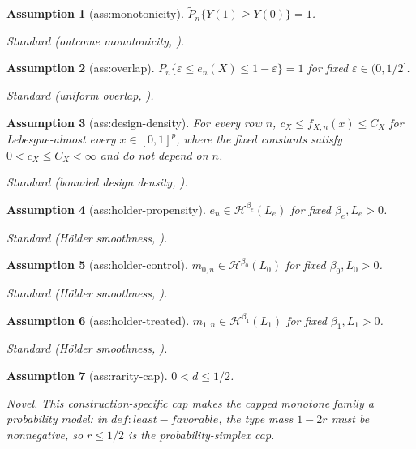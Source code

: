 \documentclass{article}
\newtheorem{assumption}{Assumption}
\begin{document}
\begin{assumption}[ass:monotonicity]\label{ass:monotonicity}
\(\widetilde P_n\{Y(1)\ge Y(0)\}=1\).
\par\smallskip\noindent\emph{Standard} (outcome monotonicity, \cite{TianPearl2000}).
\end{assumption}

\begin{assumption}[ass:overlap]\label{ass:overlap}
\(P_n\{\varepsilon\le e_n(X)\le1-\varepsilon\}=1\) for fixed \(\varepsilon\in(0,1/2]\).
\par\smallskip\noindent\emph{Standard} (uniform overlap, \cite{ChernozhukovEtAl2018DML}).
\end{assumption}

\begin{assumption}[ass:design-density]\label{ass:design-density}
For every row \(n\), \(c_X\le f_{X,n}(x)\le C_X\) for Lebesgue-almost every \(x\in[0,1]^p\), where the fixed constants satisfy \(0<c_X\le C_X<\infty\) and do not depend on \(n\).
\par\smallskip\noindent\emph{Standard} (bounded design density, \cite{Chen2007}).
\end{assumption}

\begin{assumption}[ass:holder-propensity]\label{ass:holder-propensity}
\(e_n\in\mathcal H^{\beta_e}(L_e)\) for fixed \(\beta_e,L_e>0\).
\par\smallskip\noindent\emph{Standard} (Hölder smoothness, \cite{Chen2007}).
\end{assumption}

\begin{assumption}[ass:holder-control]\label{ass:holder-control}
\(m_{0,n}\in\mathcal H^{\beta_0}(L_0)\) for fixed \(\beta_0,L_0>0\).
\par\smallskip\noindent\emph{Standard} (Hölder smoothness, \cite{Chen2007}).
\end{assumption}

\begin{assumption}[ass:holder-treated]\label{ass:holder-treated}
\(m_{1,n}\in\mathcal H^{\beta_1}(L_1)\) for fixed \(\beta_1,L_1>0\).
\par\smallskip\noindent\emph{Standard} (Hölder smoothness, \cite{Chen2007}).
\end{assumption}

\begin{assumption}[ass:rarity-cap]\label{ass:rarity-cap}
\(0<\bar d\le1/2\).
\par\smallskip\noindent\emph{Novel.} This construction-specific cap makes the capped monotone family a probability model: in \(def:least-favorable\), the type mass \(1-2r\) must be nonnegative, so \(r\le1/2\) is the probability-simplex cap.
\end{assumption}
\end{document}
